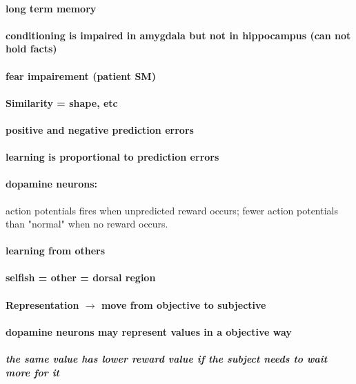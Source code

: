 \documentclass[12pt,article,oneside,a4paper]{memoir}
\begin{document}
\paragraph{long term memory}
\paragraph{conditioning is impaired in amygdala but not in hippocampus (can not hold facts)}
\paragraph{fear impairement (patient SM)}
\paragraph{Similarity = shape, etc}
\paragraph{positive and negative prediction errors}
\paragraph{learning is proportional to prediction errors}

\paragraph{dopamine neurons:} action potentials fires when unpredicted reward occurs; fewer action potentials than "normal" when no reward occurs.

\paragraph{learning from others}
\paragraph{selfish = other = dorsal region}

\paragraph{Representation $\rightarrow$ move from objective to subjective}
\paragraph{dopamine neurons may represent values in a objective way}
\subparagraph{the same value has lower reward value if the subject needs to wait more for it}
\end{document}
